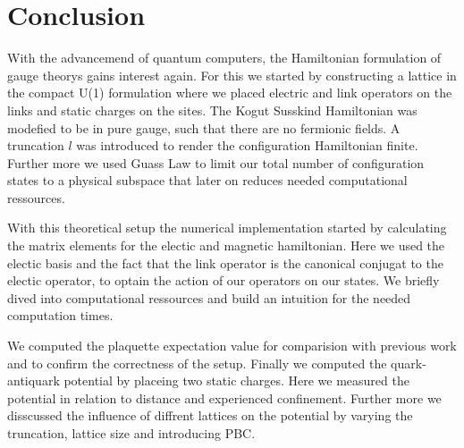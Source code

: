 \section{Conclusion}
With the advancemend of quantum computers, the Hamiltonian formulation of gauge theorys gains interest again. For this we started by constructing a lattice in the compact U(1) formulation where we placed electric and link operators on the links and static charges on the sites. The Kogut Susskind Hamiltonian was modefied to be in pure gauge, such that there are no fermionic fields. A truncation $l$ was introduced to render the configuration Hamiltonian finite. Further more we used Guass Law to limit our total number of configuration states to a physical subspace that later on reduces needed computational ressources.

With this theoretical setup the numerical implementation started by calculating the matrix elements for the electic and magnetic hamiltonian. Here we used the electic basis and the fact that the link operator is the canonical conjugat to the electic operator, to optain the action of our operators on our states. We briefly dived into computational ressources and build an intuition for the needed computation times.

We computed the plaquette expectation value for comparision with previous work and to confirm the correctness of the setup. Finally we computed the quark-antiquark potential by placeing two static charges. Here we measured the potential in relation to distance and experienced confinement. Further more we disscussed the influence of diffrent lattices on the potential by varying the truncation, lattice size and introducing PBC.


